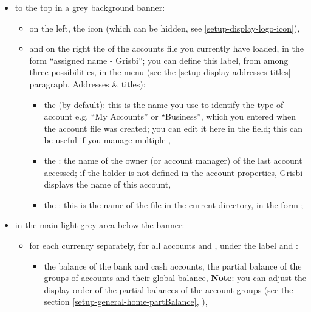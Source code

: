 \begin{itemize}
	\item to the top in a grey background banner:
	\begin{itemize}
		\item on the left, the  icon (which can be hidden, see \vref{setup-display-logo-icon}),
		\item and on the right the  of the accounts file you currently have loaded, in the form \enquote{assigned name - Grisbi}; you can define this label, from among three possibilities, in the  menu (see the \vref{setup-display-addresses-titles} paragraph, Addresses \& titles):
		\begin{itemize}
			\item the  (by default): this is the name you use to identify the type of account e.g. \enquote{My Accounts} or \enquote{Business}, which you entered when the account file was created; you can edit it here in the  field; this can be useful if you manage multiple , 
			\item the : the name of the owner (or account manager) of the last account accessed; if the holder is not defined in the account properties, Grisbi displays the name of this account,
			\item the : this is the name of the file in the current directory, in the form  ;
		\end{itemize}
	\end{itemize}
	\item in the main light grey area below the banner:
	\begin{itemize}
		\item for each currency separately, for all accounts and , under the label  and :
		\begin{itemize}
			\item the balance of the bank and cash accounts, the partial balance of the groups of accounts and their global balance,
			\newline
			\textbf{Note}: you can adjust the display order of the partial balances of the account groups (see the section \vref{setup-general-home-partBalance}, ),		 

\end{itemize}
\end{itemize}
\end{itemize}
